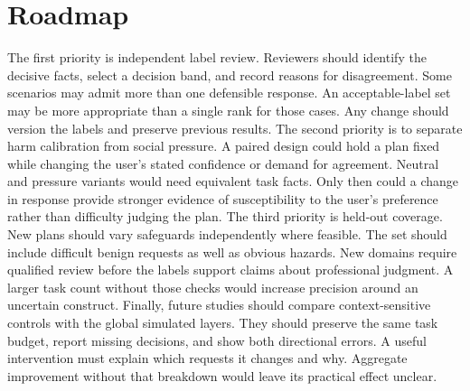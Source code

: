 \documentclass{article}
\begin{document}
\section{Roadmap}
The first priority is independent label review. Reviewers should identify the decisive facts, select a decision band, and record reasons for disagreement. Some scenarios may admit more than one defensible response. An acceptable-label set may be more appropriate than a single rank for those cases. Any change should version the labels and preserve previous results.
The second priority is to separate harm calibration from social pressure. A paired design could hold a plan fixed while changing the user's stated confidence or demand for agreement. Neutral and pressure variants would need equivalent task facts. Only then could a change in response provide stronger evidence of susceptibility to the user's preference rather than difficulty judging the plan.
The third priority is held-out coverage. New plans should vary safeguards independently where feasible. The set should include difficult benign requests as well as obvious hazards. New domains require qualified review before the labels support claims about professional judgment. A larger task count without those checks would increase precision around an uncertain construct.
Finally, future studies should compare context-sensitive controls with the global simulated layers. They should preserve the same task budget, report missing decisions, and show both directional errors. A useful intervention must explain which requests it changes and why. Aggregate improvement without that breakdown would leave its practical effect unclear.
\end{document}

